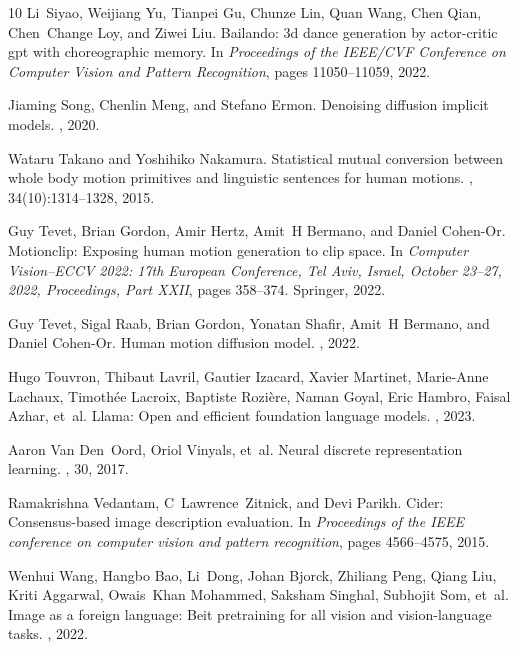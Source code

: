 \documentclass{article}
\begin{document}
{\begin{thebibliography}{10}
  Li~Siyao, Weijiang Yu, Tianpei Gu, Chunze Lin, Quan Wang, Chen Qian,
    Chen~Change Loy, and Ziwei Liu.
  \newblock Bailando: 3d dance generation by actor-critic gpt with choreographic
    memory.
  \newblock In {\em Proceedings of the IEEE/CVF Conference on Computer Vision and
    Pattern Recognition}, pages 11050--11059, 2022.
  
  Jiaming Song, Chenlin Meng, and Stefano Ermon.
  \newblock Denoising diffusion implicit models.
  , 2020.
  
  Wataru Takano and Yoshihiko Nakamura.
  \newblock Statistical mutual conversion between whole body motion primitives
    and linguistic sentences for human motions.
  ,
    34(10):1314--1328, 2015.
  
  Guy Tevet, Brian Gordon, Amir Hertz, Amit~H Bermano, and Daniel Cohen-Or.
  \newblock Motionclip: Exposing human motion generation to clip space.
  \newblock In {\em Computer Vision--ECCV 2022: 17th European Conference, Tel
    Aviv, Israel, October 23--27, 2022, Proceedings, Part XXII}, pages 358--374.
    Springer, 2022.
  
  Guy Tevet, Sigal Raab, Brian Gordon, Yonatan Shafir, Amit~H Bermano, and Daniel
    Cohen-Or.
  \newblock Human motion diffusion model.
  , 2022.
  
  Hugo Touvron, Thibaut Lavril, Gautier Izacard, Xavier Martinet, Marie-Anne
    Lachaux, Timoth{\'e}e Lacroix, Baptiste Rozi{\`e}re, Naman Goyal, Eric
    Hambro, Faisal Azhar, et~al.
  \newblock Llama: Open and efficient foundation language models.
  , 2023.
  
  Aaron Van Den~Oord, Oriol Vinyals, et~al.
  \newblock Neural discrete representation learning.
  , 30, 2017.
  
  Ramakrishna Vedantam, C~Lawrence~Zitnick, and Devi Parikh.
  \newblock Cider: Consensus-based image description evaluation.
  \newblock In {\em Proceedings of the IEEE conference on computer vision and
    pattern recognition}, pages 4566--4575, 2015.
  
  Wenhui Wang, Hangbo Bao, Li~Dong, Johan Bjorck, Zhiliang Peng, Qiang Liu, Kriti
    Aggarwal, Owais~Khan Mohammed, Saksham Singhal, Subhojit Som, et~al.
  \newblock Image as a foreign language: Beit pretraining for all vision and
    vision-language tasks.
  , 2022.
  

\end{thebibliography}}
\end{document}
